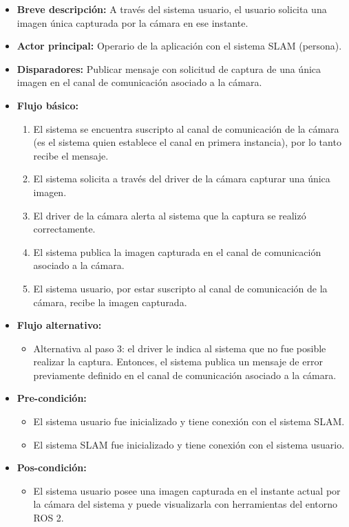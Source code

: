 \documentclass[12pt,a4paper, twosite]{article}
\begin{document}
\begin{itemize}
  \item \textbf{Breve descripción:} A través del sistema usuario, el usuario solicita una
  imagen única capturada por la cámara en ese instante.
  \item \textbf{Actor principal:} Operario de la aplicación con el sistema SLAM (persona).
  \item \textbf{Disparadores:} Publicar mensaje con solicitud de captura de una única imagen en
  el canal de comunicación asociado a la cámara.
  \item \textbf{Flujo básico:}
  \begin{enumerate}
    \item El sistema se encuentra suscripto al canal de comunicación de la cámara (es el sistema
    quien establece el canal en primera instancia), por lo tanto recibe el mensaje.
    \item El sistema solicita a través del driver de la cámara capturar una única imagen.
    \item El driver de la cámara alerta al sistema que la captura se realizó
    correctamente.
    \item El sistema publica la imagen capturada en el canal de comunicación asociado a la
    cámara.
    \item El sistema usuario, por estar suscripto al canal de comunicación de la cámara,
    recibe la imagen capturada.
  \end{enumerate}
  \item \textbf{Flujo alternativo:}
  \begin{itemize}
    \item Alternativa al paso 3: el driver le indica al sistema que no fue posible realizar la
    captura. Entonces, el sistema publica un mensaje de error previamente definido en el
    canal de comunicación asociado a la cámara.
  \end{itemize}
  \item \textbf{Pre-condición:}
  \begin{itemize}
    \item El sistema usuario fue inicializado y tiene conexión con el sistema SLAM.
    \item El sistema SLAM fue inicializado y tiene conexión con el sistema usuario.
  \end{itemize}
  \item \textbf{Pos-condición:}
  \begin{itemize}
    \item El sistema usuario posee una imagen capturada en el instante actual por la cámara
    del sistema y puede visualizarla con herramientas del entorno ROS 2.
  \end{itemize}
\end{itemize}
\end{document}
